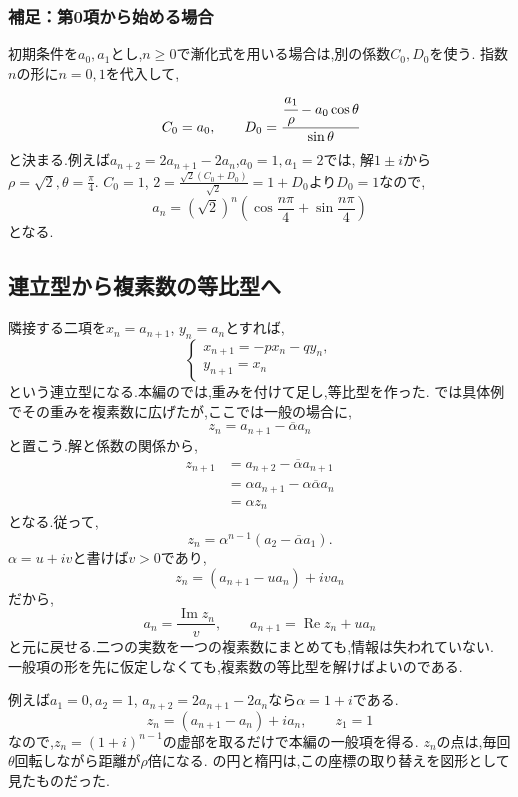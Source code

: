 \subsubsection{補足：第0項から始める場合}
初期条件を$a_0,a_1$とし,$n\ge0$で漸化式を用いる場合は,別の係数$C_0,D_0$を使う.
指数$n$の形に$n=0,1$を代入して,
\[
  C_0=a_0,\qquad
  D_0=\cfrac{\cfrac{a_1}{\rho}-a_0\cos\theta}{\sin\theta}
\]
と決まる.例えば$a_{n+2}=2a_{n+1}-2a_n$,$a_0=1,a_1=2$では,
解$1\pm i$から$\rho=\sqrt2,\theta=\frac{\pi}{4}$.
$C_0=1$, $2=\frac{\sqrt2(C_0+D_0)}{\sqrt2}=1+D_0$より$D_0=1$なので,
\[
  a_n=(\sqrt2)^n\left(\cos\frac{n\pi}{4}+\sin\frac{n\pi}{4}\right)
\]
となる.

\subsection{連立型から複素数の等比型へ}\label{節：連立型から複素数の等比型へ}
隣接する二項を$x_n=a_{n+1}$, $y_n=a_n$とすれば,
\[
  \begin{cases}
    x_{n+1}=-px_n-qy_n,\\
    y_{n+1}=x_n
  \end{cases}
\]
という連立型になる.本編のでは,重みを付けて足し,等比型を作った.
では具体例でその重みを複素数に広げたが,ここでは一般の場合に,
\[
  z_n=a_{n+1}-\overline\alpha a_n
\]
と置こう.解と係数の関係から,
\[
  \begin{aligned}
    z_{n+1}&=a_{n+2}-\overline\alpha a_{n+1}\\
      &=\alpha a_{n+1}-\alpha\overline\alpha a_n\\
      &=\alpha z_n
  \end{aligned}
\]
となる.従って,
\[
  z_n=\alpha^{n-1}(a_2-\overline\alpha a_1).
\]
$\alpha=u+iv$と書けば$v>0$であり,
\[
  z_n=(a_{n+1}-ua_n)+iv a_n
\]
だから,
\[
  a_n=\frac{\operatorname{Im}z_n}{v},\qquad
  a_{n+1}=\operatorname{Re}z_n+ua_n
\]
と元に戻せる.二つの実数を一つの複素数にまとめても,情報は失われていない.
一般項の形を先に仮定しなくても,複素数の等比型を解けばよいのである.

例えば$a_1=0,a_2=1$, $a_{n+2}=2a_{n+1}-2a_n$なら$\alpha=1+i$である.
\[
  z_n=(a_{n+1}-a_n)+ia_n,\qquad z_1=1
\]
なので,$z_n=(1+i)^{n-1}$の虚部を取るだけで本編の一般項を得る.
$z_n$の点は,毎回$\theta$回転しながら距離が$\rho$倍になる.
の円と楕円は,この座標の取り替えを図形として見たものだった.


